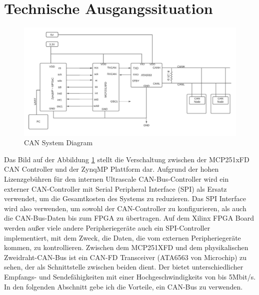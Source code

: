 \section{Technische Ausgangssituation}
\label{sec:technische_ausgangssituation}

\begin{figure}[h]
	\begin{center}
		\includegraphics[width=1.2\textwidth]{./images/can_bus_system.jpeg}
	\end{center}
	\vspace{-3pt}
	\caption[CAN System Diagram]{CAN System Diagram} %
	\label{fig:can_system_diagram}
	\vspace{-5pt}
\end{figure}

Das Bild auf der Abbildung \ref{fig:can_system_diagram} stellt die Verschaltung zwischen der MCP251xFD CAN Controller und der ZynqMP Plattform dar. Aufgrund der hohen Lizenzgebühren für den internen Ultrascale CAN-Bus-Controller wird ein externer CAN-Controller mit Serial Peripheral Interface (SPI) als Ersatz verwendet, um die Gesamtkosten des Systems zu reduzieren. Das SPI Interface wird also verwenden, um sowohl der CAN-Controller zu  konfigurieren, als auch die CAN-Bus-Daten bis zum FPGA zu übertragen. Auf dem Xilinx FPGA Board werden außer viele andere Peripheriegeräte auch ein SPI-Controller implementiert, mit dem Zweck, die Daten, die vom externen Peripheriegeräte kommen, zu kontrollieren. Zwischen dem MCP251XFD und dem physikalischen Zweidraht-CAN-Bus ist ein CAN-FD Transceiver (ATA6563 von Microchip) zu sehen, der als Schnittstelle zwischen beiden dient. Der bietet unterschiedlicher Empfangs- und Sendefähigkeiten mit einer Hochgeschwindigkeits von bis 5Mbit/s. In den folgenden Abschnitt gebe ich die Vorteile, ein CAN-Bus zu verwenden.